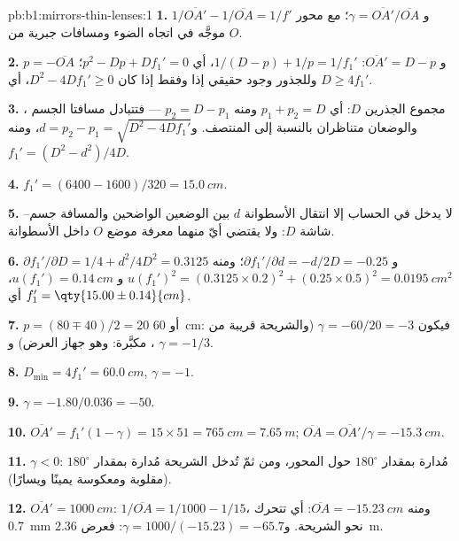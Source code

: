 \begin{solution}{pb:b1:mirrors-thin-lenses:1}
\textbf{1.} $1/\overline{OA'} - 1/\overline{OA} = 1/f'$ و
$\gamma = \overline{OA'}/\overline{OA}$؛ مع محور موجَّه في اتجاه الضوء
ومسافات جبرية من $O$.

\textbf{2.} $p = -\overline{OA}$ و $\overline{OA'} = D - p$:
$1/(D - p) + 1/p = 1/f_1'$، أي $p^2 - Dp + Df_1' = 0$؛ وللجذور وجود حقيقي إذا وفقط إذا كان
$D^2 - 4Df_1' \geq 0$، أي $D \geq 4f_1'$.

\textbf{3.} مجموع الجذرين $D$: أي $p_1 + p_2 = D$ ومنه $p_2 = D - p_1$ ---
فتتبادل مسافتا الجسم ، والوضعان متناظران بالنسبة إلى
المنتصف. و$d = p_2 - p_1 = \sqrt{D^2 - 4Df_1'}$، ومنه $f_1' = (D^2 -
d^2)/4D$.

\textbf{4.} $f_1' = (6400 - 1600)/320 = \qty{15.0}{cm}$.

\textbf{5.} لا يدخل في الحساب إلا انتقال الأسطوانة $d$ بين الوضعين
الواضحين والمسافة جسم--شاشة $D$: ولا يقتضي أيّ منهما
معرفة موضع $O$ داخل الأسطوانة.

\textbf{6.} $\partial f_1'/\partial D = 1/4 + d^2/4D^2 = 0.3125$ و
$\partial f_1'/\partial d = -d/2D = -0.25$؛ ومنه
$u(f_1')^2 = (0.3125 \times 0.2)^2 + (0.25 \times 0.5)^2 =
\qty{0.0195}{cm^2}$ و $u(f_1') = \qty{0.14}{cm}$، أي
$f_1' = \qty{15.00\pm0.14}{cm}$.

\textbf{7.} $p = (80 \mp 40)/2 = 20$ أو \qty{60}{cm}: فيكون $\gamma =
-60/20 = -3$ (والشريحة قريبة من ،  مكبَّرة: وهو جهاز العرض) و
$\gamma = -1/3$.

\textbf{8.} $D_{\min} = 4f_1' = \qty{60.0}{cm}$, $\gamma = -1$.

\textbf{9.} $\gamma = -1.80/0.036 = -50$.

\textbf{10.} $\overline{OA'} = f_1'(1 - \gamma) = 15 \times 51 =
\qty{765}{cm} = \qty{7.65}{m}$; $\overline{OA} = \overline{OA'}/\gamma =
\qty{-15.3}{cm}$.

\textbf{11.} $\gamma < 0$:  مُدارة بمقدار $180^\circ$
حول المحور، ومن ثمّ تُدخل الشريحة مُدارة بمقدار $180^\circ$ (مقلوبة
ومعكوسة يمينًا ويسارًا).

\textbf{12.} $\overline{OA'} = \qty{1000}{cm}$: $1/\overline{OA} = 1/1000
- 1/15$، ومنه $\overline{OA} = \qty{-15.23}{cm}$: أي تتحرك  \qty{0.7}{mm}
نحو الشريحة. و$\gamma = 1000/(-15.23) = -65.7$: فعرض 
\qty{2.36}{m}.


\end{solution}

